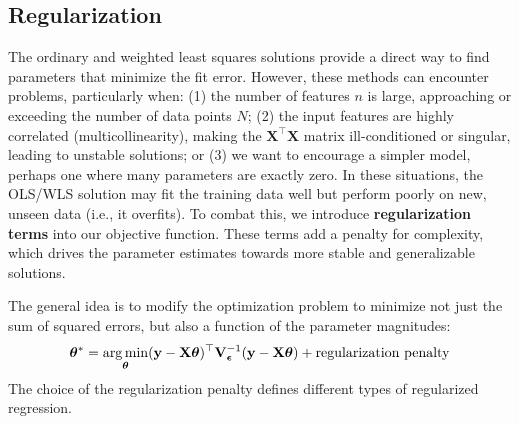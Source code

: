 \subsection{Regularization}
The ordinary and weighted least squares solutions provide a direct way to find parameters that minimize the fit error. However, these methods can encounter problems, particularly when: (1) the number of features $n$ is large, approaching or exceeding the number of data points $N$; (2) the input features are highly correlated (multicollinearity), making the $\mathbf{X}^\top\mathbf{X}$ matrix ill-conditioned or singular, leading to unstable solutions; or (3) we want to encourage a simpler model, perhaps one where many parameters are exactly zero. In these situations, the OLS/WLS solution may fit the training data well but perform poorly on new, unseen data (i.e., it overfits). To combat this, we introduce \textbf{regularization terms} into our objective function. These terms add a penalty for complexity, which drives the parameter estimates towards more stable and generalizable solutions.

The general idea is to modify the optimization problem to minimize not just the sum of squared errors, but also a function of the parameter magnitudes:
\begin{equation}
    \boldsymbol{\theta}^* = \operatorname*{arg\,min}_{\boldsymbol{\theta}}  (\mathbf{y} - \mathbf{X}\boldsymbol{\theta})^\top \mathbf{V}_{\boldsymbol{\epsilon}}^{-1} (\mathbf{y} - \mathbf{X}\boldsymbol{\theta}) + \text{regularization penalty} 
    \label{eq:regularization-general}
\end{equation}
The choice of the regularization penalty defines different types of regularized regression.


